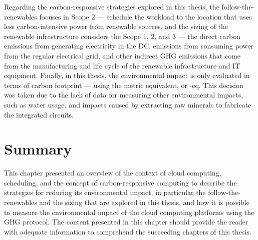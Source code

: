 Regarding the carbon-responsive strategies explored in this thesis, the follow-the-renewables focuses in Scope 2 --- schedule the workload to the location that uses less carbon-intensive power from renewable sources, and the sizing of the renewable infrastructure considers the  Scope 1, 2, and 3 --- the direct carbon emissions from generating electricity in the DC, emissions from consuming power from the regular electrical grid, and other indirect GHG emissions that come from the manufacturing and life cycle of the renewable infrastructure and IT equipment. Finally, in this thesis, the environmental impact is only evaluated in terms of carbon footprint --- using the metric  equivalent, or -eq. This decision was taken due to the lack of data for measuring other environmental impacts, such as water usage, and impacts caused by extracting raw minerals to fabricate the integrated circuits.

\section{Summary}

This chapter presented an overview of the context of cloud computing, scheduling, and the concept of carbon-responsive computing to describe the strategies for reducing its environmental impact, in particular the follow-the-renewables and the sizing that are explored in this thesis, and how it is possible to measure the environmental impact of the cloud computing platforms using the GHG protocol. The content presented in this chapter should provide the reader with adequate information to comprehend the succeeding chapters of this thesis.
